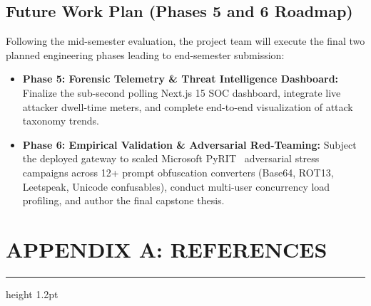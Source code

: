 \documentclass[12pt,a4paper,oneside]{report}
\begin{document}
\section{Future Work Plan (Phases 5 and 6 Roadmap)}
Following the mid-semester evaluation, the project team will execute the final two planned engineering phases leading to end-semester submission:
\begin{itemize}
    \item \textbf{Phase 5: Forensic Telemetry \& Threat Intelligence Dashboard:} Finalize the sub-second polling Next.js 15 SOC dashboard, integrate live attacker dwell-time meters, and complete end-to-end visualization of attack taxonomy trends.
    \item \textbf{Phase 6: Empirical Validation \& Adversarial Red-Teaming:} Subject the deployed gateway to scaled Microsoft PyRIT~\cite{pyrit2024} adversarial stress campaigns across 12+ prompt obfuscation converters (Base64, ROT13, Leetspeak, Unicode confusables), conduct multi-user concurrency load profiling, and author the final capstone thesis.
\end{itemize}

\newpage

\chapter*{APPENDIX A: REFERENCES}
\hrule height 1.2pt
\vspace{0.18in}

\begingroup
\renewcommand{\chapter}[2]{}
\renewcommand{\clearpage}{}
\renewcommand{\cleardoublepage}{}
\end{document}
